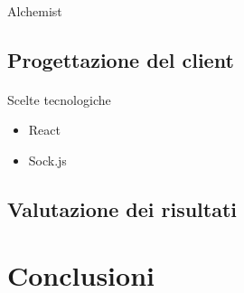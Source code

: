 \documentclass[
  usepdftitle=false,  %
  bigger,               %
  lualatex,           %
  italian             %
]{beamer}
\begin{document}
      \begin{frame}{\insertsectionhead}
        \framesubtitle{\insertsubsectionhead}

        \begin{block}{Alchemist}
        \end{block}
      \end{frame}

    \subsection{Progettazione del client}

      \begin{frame}{\insertsectionhead}
        \framesubtitle{\insertsubsectionhead}
        \begin{block}{Scelte tecnologiche}
          \begin{itemize}
            \item React   %
            \item Sock.js %
          \end{itemize}
        \end{block}
      \end{frame}

    \subsection{Valutazione dei risultati}

  \section{Conclusioni}
\end{document}

